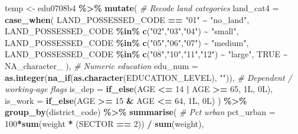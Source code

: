 \documentclass[
]{article}
\newenvironment{Shaded}{\begin{snugshade}}{\end{snugshade}}
\newcommand{\AttributeTok}[1]{\textcolor[rgb]{0.13,0.29,0.53}{#1}}
\newcommand{\CommentTok}[1]{\textcolor[rgb]{0.56,0.35,0.01}{\textit{#1}}}
\newcommand{\ConstantTok}[1]{\textcolor[rgb]{0.56,0.35,0.01}{#1}}
\newcommand{\DataTypeTok}[1]{\textcolor[rgb]{0.13,0.29,0.53}{#1}}
\newcommand{\DecValTok}[1]{\textcolor[rgb]{0.00,0.00,0.81}{#1}}
\newcommand{\FunctionTok}[1]{\textcolor[rgb]{0.13,0.29,0.53}{\textbf{#1}}}
\newcommand{\NormalTok}[1]{#1}
\newcommand{\OtherTok}[1]{\textcolor[rgb]{0.56,0.35,0.01}{#1}}
\newcommand{\SpecialCharTok}[1]{\textcolor[rgb]{0.81,0.36,0.00}{\textbf{#1}}}
\newcommand{\StringTok}[1]{\textcolor[rgb]{0.31,0.60,0.02}{#1}}
\begin{document}
\begin{Shaded}
\begin{Highlighting}[]
\NormalTok{temp }\OtherTok{\textless{}{-}}\NormalTok{ edu0708b4 }\SpecialCharTok{\%\textgreater{}\%}
  \FunctionTok{mutate}\NormalTok{(}
    \CommentTok{\# Recode land categories}
    \AttributeTok{land\_cat4 =} \FunctionTok{case\_when}\NormalTok{(}
\NormalTok{      LAND\_POSSESSED\_CODE }\SpecialCharTok{==} \StringTok{"01"} \SpecialCharTok{\textasciitilde{}} \StringTok{"no\_land"}\NormalTok{,}
\NormalTok{      LAND\_POSSESSED\_CODE }\SpecialCharTok{\%in\%} \FunctionTok{c}\NormalTok{(}\StringTok{"02"}\NormalTok{,}\StringTok{"03"}\NormalTok{,}\StringTok{"04"}\NormalTok{) }\SpecialCharTok{\textasciitilde{}} \StringTok{"small"}\NormalTok{,}
\NormalTok{      LAND\_POSSESSED\_CODE }\SpecialCharTok{\%in\%} \FunctionTok{c}\NormalTok{(}\StringTok{"05"}\NormalTok{,}\StringTok{"06"}\NormalTok{,}\StringTok{"07"}\NormalTok{) }\SpecialCharTok{\textasciitilde{}} \StringTok{"medium"}\NormalTok{,}
\NormalTok{      LAND\_POSSESSED\_CODE }\SpecialCharTok{\%in\%} \FunctionTok{c}\NormalTok{(}\StringTok{"08"}\NormalTok{,}\StringTok{"10"}\NormalTok{,}\StringTok{"11"}\NormalTok{,}\StringTok{"12"}\NormalTok{) }\SpecialCharTok{\textasciitilde{}} \StringTok{"large"}\NormalTok{,}
      \ConstantTok{TRUE} \SpecialCharTok{\textasciitilde{}} \ConstantTok{NA\_character\_}
\NormalTok{    ),}
    \CommentTok{\# Numeric education}
    \AttributeTok{edu\_num =} \FunctionTok{as.integer}\NormalTok{(}\FunctionTok{na\_if}\NormalTok{(}\FunctionTok{as.character}\NormalTok{(EDUCATION\_LEVEL), }\StringTok{""}\NormalTok{)),}
    \CommentTok{\# Dependent / working‐age flags}
    \AttributeTok{is\_dep   =} \FunctionTok{if\_else}\NormalTok{(AGE }\SpecialCharTok{\textless{}=} \DecValTok{14} \SpecialCharTok{|}\NormalTok{ AGE }\SpecialCharTok{\textgreater{}=} \DecValTok{65}\NormalTok{, }\DecValTok{1}\DataTypeTok{L}\NormalTok{, }\DecValTok{0}\DataTypeTok{L}\NormalTok{),}
    \AttributeTok{is\_work  =} \FunctionTok{if\_else}\NormalTok{(AGE }\SpecialCharTok{\textgreater{}=} \DecValTok{15} \SpecialCharTok{\&}\NormalTok{ AGE }\SpecialCharTok{\textless{}=} \DecValTok{64}\NormalTok{, }\DecValTok{1}\DataTypeTok{L}\NormalTok{, }\DecValTok{0}\DataTypeTok{L}\NormalTok{)}
\NormalTok{  ) }\SpecialCharTok{\%\textgreater{}\%}
  \FunctionTok{group\_by}\NormalTok{(district\_code) }\SpecialCharTok{\%\textgreater{}\%}
  \FunctionTok{summarise}\NormalTok{(}
    \CommentTok{\# Pct urban}
    \AttributeTok{pct\_urban =} \DecValTok{100}\SpecialCharTok{*}\FunctionTok{sum}\NormalTok{(weight }\SpecialCharTok{*}\NormalTok{ (SECTOR }\SpecialCharTok{==} \DecValTok{2}\NormalTok{)) }\SpecialCharTok{/} \FunctionTok{sum}\NormalTok{(weight),}
    

\end{Highlighting}
\end{Shaded}
\end{document}
